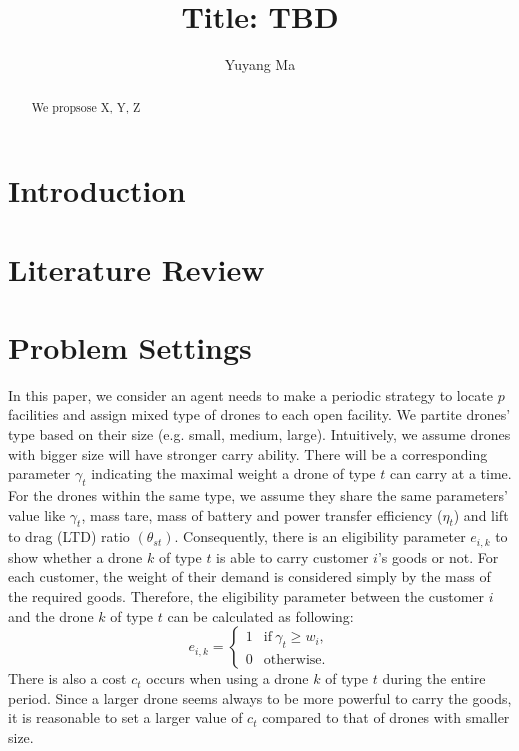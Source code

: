 \documentclass[preprint,review,11pt,authoryear]{elsarticle}
\begin{document}
\begin{frontmatter}

\title{Title: TBD}


\author[mymainaddress1]{Yuyang Ma}
\address[mymainaddress1]{Department of Industrial and Systems Engineering, Lehigh University, Bethlehem, PA,  USA}



\begin{abstract}


\noindent We propsose X, Y, Z

\begin{keyword} 

\end{keyword}



\end{abstract}
\end{frontmatter}

\section{Introduction} \label{sec:introduction}

\section{Literature Review}\label{sec:Review1}


\section{Problem Settings}\label{sec:Review2}
In this paper, we consider an agent needs to make a periodic strategy to locate $p$ facilities and assign mixed type of drones to each open facility. We partite drones' type based on their size (e.g. small, medium, large). Intuitively, we assume drones with bigger size will have stronger carry ability. There will be a corresponding parameter $\gamma_t$ indicating the maximal weight a drone of type $t$ can carry at a time. For the drones within the same type, we assume they share the same parameters' value like $\gamma_t$, mass tare, mass of battery and power transfer efficiency ($\eta_t$) and lift to drag (LTD) ratio $(\theta_{st})$. Consequently, there is an eligibility parameter $e_{i,k}$ to show whether a drone $k$ of type $t$ is able to carry customer $i$'s goods or not. For each customer, the weight of their demand is considered simply by the mass of the required goods. Therefore, the eligibility parameter between the customer $i$ and the drone $k$ of type $t$ can be calculated as following:
\begin{equation}
    e_{i,k} = 
    \begin{cases}
        1 & \text{if} ~ \gamma_t \geq w_i, \\
        0 & \text{otherwise}.
    \end{cases}
\end{equation}
There is also a cost $c_t$ occurs when using a drone $k$ of type $t$ during the entire period. Since a larger drone seems always to be more powerful to carry the goods, it is reasonable to set a larger value of $c_t$ compared to that of drones with smaller size. 
\end{document}
